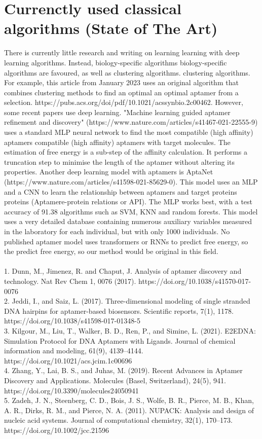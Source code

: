 \documentclass{article}
\begin{document}
\section*{Currenctly used classical algorithms (State of The Art)}
There is currently little research and writing on learning 
learning with deep learning algorithms. Instead, biology-specific algorithms 
biology-specific algorithms are favoured, as well as clustering algorithms. 
clustering algorithms. For example, this article from January 2023 uses 
an original algorithm that combines clustering methods to find an optimal 
an optimal aptamer from a selection. 
https://pubs.acs.org/doi/pdf/10.1021/acssynbio.2c00462.
However, some recent papers use deep learning. 
"Machine learning guided aptamer refinement 
and discovery" (https://www.nature.com/articles/s41467-021-22555-9) 
uses a standard MLP neural network to find the most compatible (high affinity) aptamers 
compatible (high affinity) aptamers with target molecules. The estimation of 
free energy is a sub-step of the affinity calculation. It performs a 
truncation step to minimise the length of the aptamer without altering its properties. 
Another deep learning model with aptamers is AptaNet 
(https://www.nature.com/articles/s41598-021-85629-0). This model uses an 
MLP and a CNN to learn the relationship between aptamers and target proteins 
proteins (Aptamere-protein relations or API). The MLP works best, with a 
test accuracy of 91.38%
algorithms such as SVM, KNN and random forests. This model 
uses a very detailed database containing numerous auxiliary variables 
measured in the laboratory for each individual, but with only 1000 individuals. 
No published aptamer model uses transformers or RNNs to predict free energy, so the 
predict free energy, so our method would be original in this field.
\\\\
1.	Dunn, M., Jimenez, R. and Chaput, J. Analysis of aptamer discovery and technology. Nat Rev Chem 1, 0076 (2017). https://doi.org/10.1038/s41570-017-0076
\\
2.	Jeddi, I., and Saiz, L. (2017). Three-dimensional modeling of single stranded DNA hairpins for aptamer-based biosensors. Scientific reports, 7(1), 1178. https://doi.org/10.1038/s41598-017-01348-5
\\
3.	Kilgour, M., Liu, T., Walker, B. D., Ren, P., and Simine, L. (2021). E2EDNA: Simulation Protocol for DNA Aptamers with Ligands. Journal of chemical information and modeling, 61(9), 4139–4144. https://doi.org/10.1021/acs.jcim.1c00696
\\
4.	Zhang, Y., Lai, B. S., and Juhas, M. (2019). Recent Advances in Aptamer Discovery and Applications. Molecules (Basel, Switzerland), 24(5), 941. https://doi.org/10.3390/molecules24050941 
\\
5.	Zadeh, J. N., Steenberg, C. D., Bois, J. S., Wolfe, B. R., Pierce, M. B., Khan, A. R., Dirks, R. M., and Pierce, N. A. (2011). NUPACK: Analysis and design of nucleic acid systems. Journal of computational chemistry, 32(1), 170–173. https://doi.org/10.1002/jcc.21596 



\end{document}
